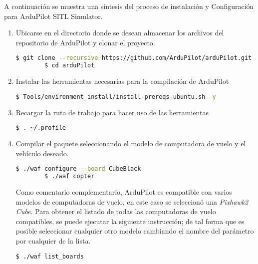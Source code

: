 A continuación se muestra una síntesis del proceso de instalación y Configuración para ArduPilot SITL Simulator.

\begin{enumerate}

    \item Ubicarse en el directorio donde se desean almacenar los archivos del repositorio de ArduPilot y clonar el proyecto.

    \begin{lstlisting}[language = bash]
        $ git clone --recursive https://github.com/ArduPilot/arduPilot.git
        $ cd arduPilot
    \end{lstlisting}    

    \item Instalar las herramientas necesarias para la compilación de ArduPilot
    
    \begin{lstlisting}[language = bash]
        $ Tools/environment_install/install-prereqs-ubuntu.sh -y
    \end{lstlisting}   

    \item Recargar la ruta de trabajo para hacer uso de las herramientas
    
    \begin{lstlisting}[language = bash]
        $ . ~/.profile
    \end{lstlisting}   

    \item Compilar el paquete seleccionando el modelo de computadora de vuelo y el vehículo deseado.

    \begin{lstlisting}[language = bash]
        $ ./waf configure --board CubeBlack
        $ ./waf copter
    \end{lstlisting}

    Como comentario complementario, ArduPilot es compatible con varios modelos de computadoras de vuelo, en este caso se seleccionó una \textit{Pixhawk2 Cube}. Para obtener el listado de todas las computadoras de vuelo compatibles, se puede ejecutar la siguiente instrucción; de tal forma que es posible seleccionar cualquier otro modelo cambiando el nombre del parámetro por cualquier de la lista. 

    \begin{lstlisting}[language = bash]
        $ ./waf list_boards
    \end{lstlisting}


\end{enumerate}
